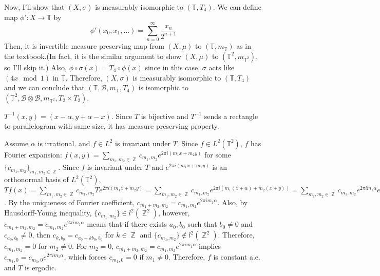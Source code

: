 \documentclass[12pt]{article}
\newenvironment{problem}[2][Problem]{\begin{trivlist}
\item[\hskip \labelsep {\bfseries #1}\hskip \labelsep {\bfseries #2.}]}{\end{trivlist}}
\DeclareMathOperator{\zz}{\mathbb{Z}}
\begin{document}
Now, I'll show that $(X,\sigma)$ is measurably isomorphic to $(\mathbb{T}, T_4)$. We can define map $\phi':X\rightarrow\mathbb{T}$ by
\begin{equation*}
    \phi'(x_0, x_1, \ldots)=\sum\limits_{n=0}^\infty \frac{x_n}{2^{n+1}}
\end{equation*}
Then, it is invertible measure preserving map from $(X, \mu)$ to $(\mathbb{T}, m_{\mathbb{T}})$ as in the textbook.(In fact, it is the similar argument to show $(X, \mu)$ to $(\mathbb{T}^2, m_{\mathbb{T}^2})$, so I'll skip it.) Also, $\phi\circ \sigma (x)=T_4\circ \phi(x)$ since in this case, $\sigma$ acts like $(4x\mod 1)$ in $\mathbb{T}$. Therefore, $(X,\sigma)$ is measurably isomorphic to $(\mathbb{T}, T_4)$ and we can conclude that $(\mathbb{T}, \mathcal{B}, m_{\mathbb{T}}, T_4)$ is isomorphic to $(\mathbb{T}^2, \mathcal{B}\otimes\mathcal{B}, m_{\mathbb{T}^2}, T_2\times T_2)$.

\begin{problem}{4}
\end{problem}
$T^{-1}(x,y)=(x-\alpha, y+\alpha-x)$. Since $T$ is bijective and $T^{-1}$ sends a rectangle to parallelogram with same size, it has measure preserving property.

Assume $\alpha$ is irrational. and $f\in L^2$ is invariant under $T$. Since $f\in L^2(\mathbb{T}^2)$, $f$ has Fourier expansion: $f(x,y)=\sum\limits_{m_1,m_2\in \zz}c_{m_1,m_2} e^{2\pi i (m_1x+m_2y)}$ for some $\{c_{m_1,m_2}\}_{m_1,m_2\in \zz}$. Since $f$ is invariant under $T$ and $e^{2\pi i (m_1x+m_2y)}$ is an orthonormal basis of $L^2(\mathbb{T}^2)$, $Tf(x)=\sum\limits_{m_1,m_2\in \zz}c_{m_1,m_2} Te^{2\pi i (m_1x+m_2y)}=\sum\limits_{m_1,m_2\in \zz}c_{m_1,m_2} e^{2\pi i (m_1(x+\alpha)+m_2(x+y))}=\sum\limits_{m_1,m_2\in \zz}c_{m_1,m_2}e^{2\pi im_1\alpha} e^{2\pi i ((m_1+m_2)x+m_2y)}$. By the uniqueness of Fourier coefficient, $c_{m_1+m_2, m_2}=c_{m_1,m_2}e^{2\pi im_1\alpha}$. Also, by Hausdorff-Young inequality, $\{c_{m_1,m_2}\}\in l^2(\zz^2)$, however, $c_{m_1+m_2, m_2}=c_{m_1,m_2}e^{2\pi im_1\alpha}$ means that if there exists $a_0, b_0$ such that $b_0\neq 0$ and $c_{a_0, b_0}\neq 0$, then $c_{k, b_0}=c_{a_0+kb_0, b_0}$ for $k\in \zz$ and $\{c_{m_1,m_2}\}\notin l^2(\zz^2)$. Therefore, $c_{m_1,m_2}=0$ for $m_2\neq 0$. For $m_2=0$, $c_{m_1+m_2, m_2}=c_{m_1,m_2}e^{2\pi im_1\alpha}$ implies $c_{m_1, 0}=c_{m_1,0}e^{2\pi im_1\alpha}$, which forces $c_{m_1,0}=0$ if $m_1\neq 0$. Therefore, $f$ is constant a.e. and $T$ is ergodic.
\end{document}
